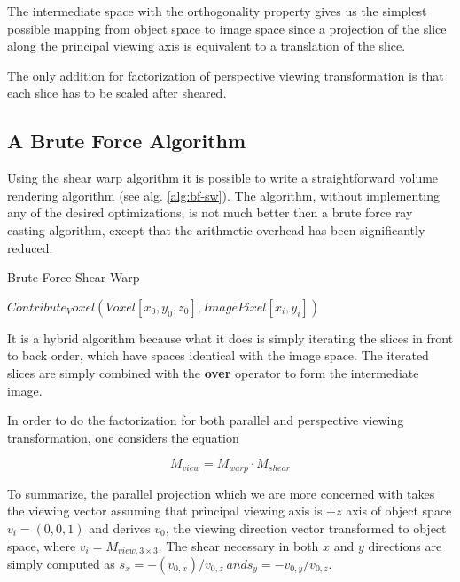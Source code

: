 \documentclass[a4paper,12pt]{article}
\begin{document}
The intermediate space with the orthogonality property gives us the
simplest possible mapping from object space to image space since a
projection of the slice along the principal viewing axis is equivalent
to a translation of the slice.

The only addition for factorization of perspective viewing
transformation is that each slice has to be scaled after sheared.

\subsection{A Brute Force Algorithm}

Using the shear warp algorithm it is possible to write a
straightforward volume rendering algorithm (see
alg. \ref{alg:bf-sw}). The
 algorithm, without implementing any of the desired optimizations, is
 not much better then a brute force ray casting algorithm, except that
 the arithmetic overhead has been significantly reduced.

\begin{algorithm}
\caption{Brute-Force-Shear-Warp}
\label{alg:bf-sw}
\begin{algorithmic}
\STATE $Contribute_Voxel(Voxel[x_0,y_0,z_0],ImagePixel[x_i,y_i])$
\ENDFOR
\ENDFOR
\ENDFOR
\ENDFOR
\ENDFOR
\end{algorithmic}
\end{algorithm}

It is a hybrid algorithm because what it does is simply iterating the
slices in front to back order, which have spaces identical with the
image space. The iterated slices are simply combined with the
\textbf{over} operator to form the intermediate image.

In order to do the factorization for both parallel and perspective
viewing transformation, one considers the equation

\begin{equation}
 M_{view} = M_{warp} \cdot M_{shear}
\end{equation}

To summarize, the parallel projection which we are more concerned with
takes the viewing vector assuming that principal viewing axis is $+z$
axis of object space $v_i = (0,0,1) $ and derives $v_0$, the
viewing direction vector transformed to object space, where $v_i =
M_{{view},{3 \times 3}}$. The shear necessary in both $x$ and $y$
directions are simply computed as $s_x = -(v_{0,x})/v_{0,z} \ and s_y
= - v_{0,y}/v_{0,z}$.
\end{document}
